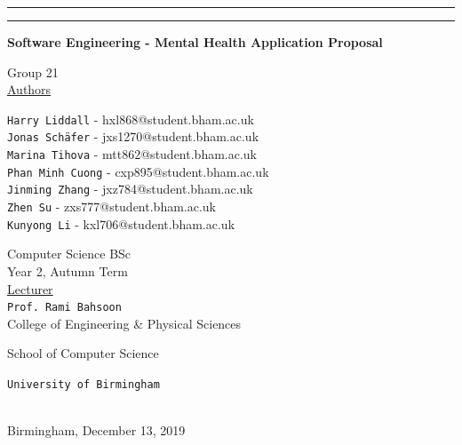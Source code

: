 \documentclass[a4paper,11pt]{article} %
\begin{document}
\thispagestyle{empty}
\begin{center}
    \rule{\textwidth}{0.5mm}\vspace{7mm}
    \Large{}\par
    \vspace{5mm}
    \rule{\textwidth}{0.5mm}\par
    \vspace{13mm}

    \large{\textbf{Software Engineering - Mental Health Application Proposal}}\par
    \vspace{5mm}
    \Large{Group 21}\\
    \vspace{5mm}
    \large
    \underline{Authors}\\
    \vspace{4mm}
    \normalsize

    \texttt{Harry Liddall} - hxl868@student.bham.ac.uk\\
    \texttt{Jonas Schäfer} - jxs1270@student.bham.ac.uk\\
    \texttt{Marina Tihova} - mtt862@student.bham.ac.uk\\
    \texttt{Phan Minh Cuong} - cxp895@student.bham.ac.uk\\
    \texttt{Jinming Zhang} - jxz784@student.bham.ac.uk\\
    \texttt{Zhen Su} - zxs777@student.bham.ac.uk\\
    \texttt{Kunyong Li} - kxl706@student.bham.ac.uk\\
    \vspace{10mm}

    \large
    Computer Science BSc \\
    \vspace{1mm}
    Year 2, Autumn Term \\
    \vspace{5mm}
    \Large{\underline{Lecturer}}\\
    \vspace{2mm}
    \large
    \texttt{Prof. Rami Bahsoon}\\
    \vspace{10mm}
    College of Engineering \& Physical Sciences\par
    \vspace{3mm}
    School of Computer Science


    \vspace{15mm}

    \Large{\texttt{University of Birmingham}}\par
    \ \\
    \vspace{5mm}
    \normalsize
    Birmingham, December 13, 2019\par
\end{center}
\end{document}
